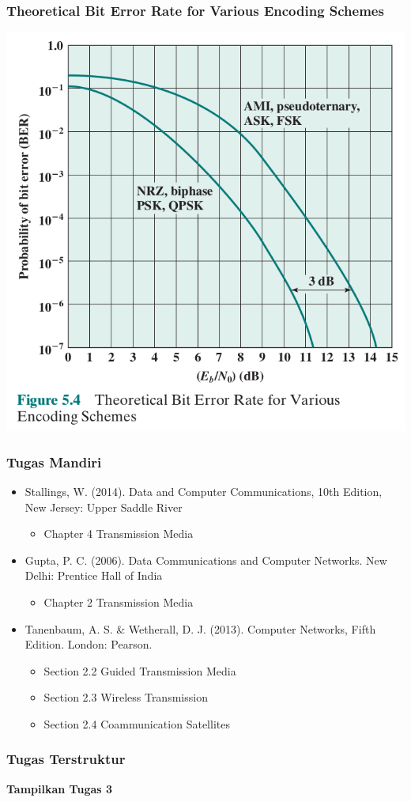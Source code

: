 \documentclass[pdflatex,compress]{beamer}
\begin{document}
\begin{frame}
	\frametitle{Theoretical Bit Error Rate for Various Encoding Schemes}
	\begin{center}
		\includegraphics[width=0.6\linewidth]{img/img06}
	\end{center}
\end{frame}

\begin{frame}
	\frametitle{Tugas Mandiri}
	\begin{itemize}
		\item Stallings, W. (2014). Data and Computer Communications, 10th Edition, New Jersey: Upper Saddle River\\
		\begin{itemize}
			\item Chapter 4 Transmission Media
		\end{itemize}
		\item Gupta, P. C. (2006). Data Communications and Computer Networks. New Delhi: Prentice Hall of India\\
		\begin{itemize}
			\item Chapter 2 Transmission Media
		\end{itemize}
		\item Tanenbaum, A. S. \& Wetherall, D. J. (2013). Computer Networks, Fifth Edition. London: Pearson.\\
		\begin{itemize}
			\item Section 2.2 Guided Transmission Media
			\item Section 2.3 Wireless Transmission
			\item Section 2.4 Coammunication Satellites
		\end{itemize}
	\end{itemize}
\end{frame}

\begin{frame}
	\frametitle{Tugas Terstruktur}
	\textbf{Tampilkan Tugas 3}
\end{frame}
\end{document}
